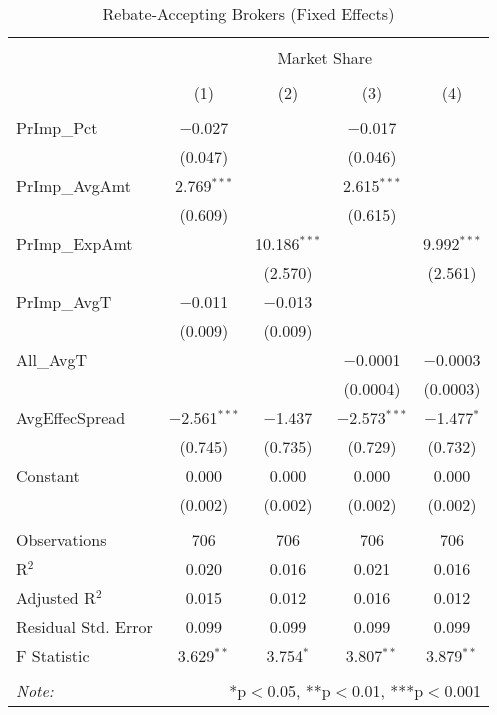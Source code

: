 \documentclass[12pt,a4paper]{article}
\begin{document}
		\begin{table}[!htbp] \centering 
			\captionsetup{font=large}
			\caption{Rebate-Accepting Brokers (Fixed Effects)} 
			\label{} 
			\begin{tabular}{@{\extracolsep{1em}}lcccc} 
				\\[-1.8ex]\hline 
				\hline \\[-1.8ex] 
				& \multicolumn{4}{c}{Market Share} \\ 
				\cline{2-5} 
				\\[-1.8ex] & (1) & (2) & (3) & (4)\\ 
				\hline \\[-1.8ex] 
				PrImp\_Pct & $-$0.027 &  & $-$0.017 &  \\ 
				& (0.047) &  & (0.046) &  \\ 
				PrImp\_AvgAmt & 2.769$^{***}$ &  & 2.615$^{***}$ &  \\ 
				& (0.609) &  & (0.615) &  \\ 
				PrImp\_ExpAmt &  & 10.186$^{***}$ &  & 9.992$^{***}$ \\ 
				&  & (2.570) &  & (2.561) \\ 
				PrImp\_AvgT & $-$0.011 & $-$0.013 &  &  \\ 
				& (0.009) & (0.009) &  &  \\ 
				All\_AvgT &  &  & $-$0.0001 & $-$0.0003 \\ 
				&  &  & (0.0004) & (0.0003) \\ 
				AvgEffecSpread & $-$2.561$^{***}$ & $-$1.437 & $-$2.573$^{***}$ & $-$1.477$^{*}$ \\ 
				& (0.745) & (0.735) & (0.729) & (0.732) \\ 
				Constant & 0.000 & 0.000 & 0.000 & 0.000 \\ 
				& (0.002) & (0.002) & (0.002) & (0.002) \\ 
				\hline \\[-1.8ex] 
				Observations & 706 & 706 & 706 & 706 \\ 
				R$^{2}$ & 0.020 & 0.016 & 0.021 & 0.016 \\ 
				Adjusted R$^{2}$ & 0.015 & 0.012 & 0.016 & 0.012 \\ 
				Residual Std. Error & 0.099  & 0.099  & 0.099  & 0.099 \\ 
				F Statistic & 3.629$^{**}$  & 3.754$^{*}$ & 3.807$^{**}$  & 3.879$^{**}$ \\ 
				\hline 
				\hline \\[-1.8ex] 
				\textit{Note:}  & \multicolumn{4}{r}{*p$<$0.05, **p$<$0.01, ***p$<$0.001} \\ 
			\end{tabular} 
		\end{table} 
	
\end{document}
